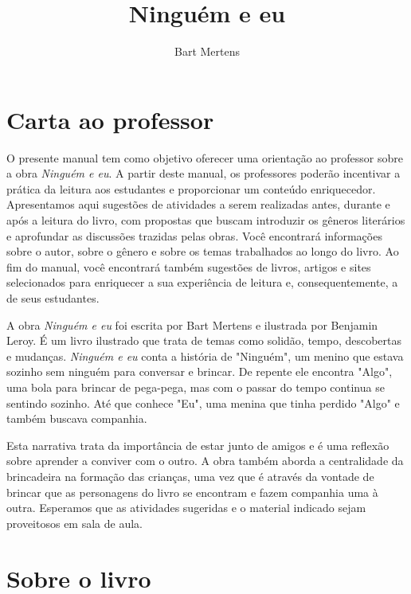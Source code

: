 \documentclass[11pt]{extarticle}
\newcommand{\AutorLivro}{Bart Mertens}
\newcommand{\TituloLivro}{Ninguém e eu}
\newcommand{\colaborador}{Ana Lancman}
\begin{document}
\title{\TituloLivro}
\author{\AutorLivro}
\def\authornotes{\colaborador}

\date{}
\maketitle


\tableofcontents

\section{Carta ao professor}

O presente manual tem como objetivo oferecer uma orientação ao professor sobre a obra \textit{Ninguém e eu}. A partir deste manual, os professores poderão incentivar a prática da leitura aos estudantes e proporcionar um conteúdo enriquecedor. Apresentamos aqui sugestões de atividades a serem realizadas antes, durante e após a leitura do livro, com propostas que buscam introduzir os gêneros literários e aprofundar as discussões trazidas pelas obras. Você encontrará informações sobre o autor, sobre o gênero e sobre os temas trabalhados ao longo do livro. Ao fim do manual, você encontrará também sugestões de livros, artigos e sites selecionados para enriquecer a sua experiência de leitura e, consequentemente, a de seus estudantes.

A obra \textit{Ninguém e eu} foi escrita por Bart Mertens e ilustrada por Benjamin Leroy. É um livro ilustrado que trata de temas como solidão, tempo, descobertas e mudanças. \textit{Ninguém e eu} conta a história de "Ninguém", um menino que estava sozinho sem ninguém para conversar e brincar. De repente ele encontra "Algo", uma bola para brincar de pega-pega, mas com o passar do tempo continua se sentindo sozinho. Até que conhece "Eu", uma menina que tinha perdido "Algo" e também buscava companhia.

Esta narrativa trata da importância de estar junto de amigos e é uma reflexão sobre aprender a conviver com o outro. 
A obra também aborda a centralidade da brincadeira na formação das crianças, uma vez que é através da vontade de brincar que as personagens do livro se encontram e fazem companhia uma à outra. Esperamos que as atividades sugeridas e o material indicado sejam proveitosos em sala de aula. 

\section{Sobre o livro}
\end{document}
